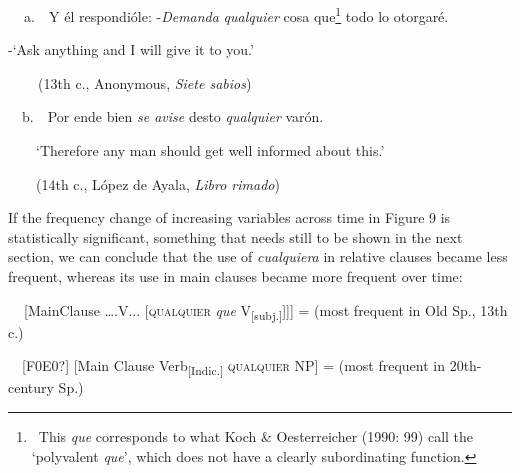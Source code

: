 \begin{styleStandard}
\textbf{\ \ }a.\ \ Y él respondióle: -\textit{Demanda} \textit{qualquier }cosa que\footnote{\ This \textit{que} corresponds to what Koch \& Oesterreicher (1990: 99) call the ‘polyvalent \textit{que}’, which does not have a clearly subordinating function.} todo lo otorgaré. 
\end{styleStandard}

\begin{styleStandard}
{}-‘Ask anything and I will give it to you.’
\end{styleStandard}

\begin{styleStandard}
\textbf{\ \ }\ \ (13th c., Anonymous, \textit{Siete sabios})
\end{styleStandard}

\begin{styleStandard}
\ \ b.\ \  Por ende bien \textit{se avise} desto \textit{qualquier} varón. 
\end{styleStandard}

\begin{styleStandard}
\ \ \ \ ‘Therefore any man should get well informed about this.’
\end{styleStandard}

\begin{styleStandard}
\ \ \ \ (14th c., López de Ayala, \textit{Libro rimado})
\end{styleStandard}

\begin{styleStandard}
If the frequency change of increasing variables across time in Figure 9 is statistically significant, something that needs still to be shown in the next section, we can conclude that the use of \textit{cualquiera} in relative clauses became less frequent, whereas its use in main clauses became more frequent over time:
\end{styleStandard}

\begin{styleStandard}
\textbf{\ \ }[MainClause ….V... [\textsc{qualquier}\textit{ que} V\textsubscript{[subj.]}]]] = (most frequent in Old Sp., 13th c.)
\end{styleStandard}

\begin{styleStandard}
\ \ [F0E0?] [Main Clause Verb\textsubscript{[Indic.] }\textsc{qualquier} NP] = (most frequent in 20th-century Sp.)
\end{styleStandard}

